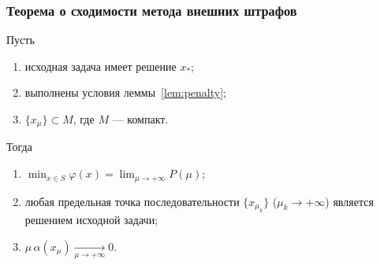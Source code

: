\subsubsection*{Теорема о сходимости метода внешних штрафов}

\begin{theorem}\label{thm:penalty}
Пусть
\begin{enumerate}[label=\arabic*),left=0pt,nosep]
  \item исходная задача имеет решение $x_*$;
  \item выполнены условия леммы~\ref{lem:penalty};
  \item $\{x_\mu\} \subset M$, где $M$ — компакт.
\end{enumerate}
Тогда
\begin{enumerate}[label=\arabic*),left=0pt,nosep]
  \item $\displaystyle \min_{x \in S}\varphi(x) = \lim_{\mu \to +\infty} P(\mu)$;
  \item любая предельная точка последовательности $\{x_{\mu_k}\}$
        ($\mu_k \to +\infty$) является решением исходной задачи;
  \item $\mu\,\alpha(x_\mu) \xrightarrow[\mu \to +\infty]{} 0$.
\end{enumerate}
\end{theorem}

